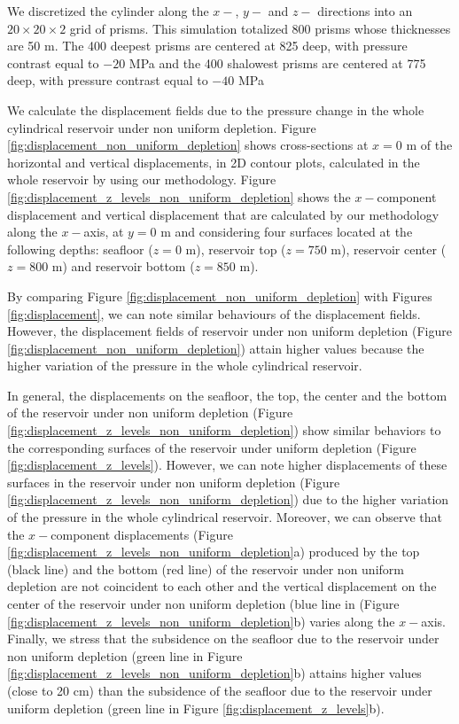 \documentclass[journal abbreviation, manuscript]{copernicus}
\begin{document}
We  discretized the cylinder  along the $x-$, $y-$ and $z-$ directions into an $20 \times 20 \times 2$ grid of prisms.
This simulation totalized 800 prisms whose thicknesses are 50 m.
The 400 deepest prisms are centered at 825 deep, with pressure contrast equal to $-20$ MPa and the 400 shalowest prisms are centered at 775 deep, with pressure contrast equal to $-40$ MPa  

We calculate the displacement fields due to the pressure change in the whole cylindrical reservoir under non uniform depletion.
Figure \ref{fig:displacement_non_uniform_depletion} shows cross-sections at $x  = 0$ m of the horizontal and vertical displacements, in 2D contour plots, calculated in the whole reservoir by using our methodology.
Figure \ref{fig:displacement_z_levels_non_uniform_depletion} shows the $x-$component displacement and vertical displacement that are calculated by our methodology along the 
$x-$axis, at $y = 0$ m and considering four surfaces located at the following depths:  seafloor ($z = 0$ m), reservoir top ($z = 750$ m), reservoir center ($z = 800$ m) and reservoir bottom ($z = 850$ m).

By comparing Figure \ref{fig:displacement_non_uniform_depletion} with Figures \ref{fig:displacement}, we can note similar behaviours of the displacement fields.
However,  the displacement fields of reservoir under non uniform depletion (Figure \ref{fig:displacement_non_uniform_depletion}) attain higher values because the higher variation of the pressure in the whole cylindrical reservoir.

In general, the displacements on the seafloor, the top, the center and the bottom of the reservoir under non uniform depletion 
(Figure \ref{fig:displacement_z_levels_non_uniform_depletion}) show similar behaviors to the corresponding surfaces of the reservoir under uniform depletion 
(Figure \ref{fig:displacement_z_levels}).
However, we can note higher displacements of  these surfaces in the reservoir under non uniform depletion (Figure \ref{fig:displacement_z_levels_non_uniform_depletion}) due to the higher variation of the pressure in the whole cylindrical reservoir.
Moreover, we can observe that the $x-$component displacements
(Figure \ref{fig:displacement_z_levels_non_uniform_depletion}a)
produced by the top (black line) and the bottom (red line) of the reservoir under non uniform depletion are not coincident to each other and the vertical displacement on the center of the reservoir under non uniform depletion (blue line in (Figure \ref{fig:displacement_z_levels_non_uniform_depletion}b) varies along the $x-$axis.
Finally, we stress that the subsidence on the seafloor due to the reservoir under non uniform depletion 
(green line in Figure  \ref{fig:displacement_z_levels_non_uniform_depletion}b) attains higher values (close to 20 cm) than the subsidence of the seafloor due to the reservoir under uniform depletion (green line in Figure  \ref{fig:displacement_z_levels}b).
\end{document}
